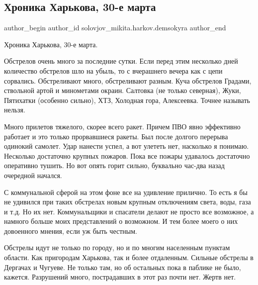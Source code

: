  
 
 
 
 
 
\subsection{Хроника Харькова, 30-е марта}
\label{sec:30_03_2022.fb.solovjov_mikita.harkov.demsokyra.1.hronika}
 
\ifcmt
 author_begin
   author_id solovjov_mikita.harkov.demsokyra
 author_end
\fi

Хроника Харькова, 30-е марта. 

Обстрелов очень много за последние сутки. Если перед этим несколько дней
количество обстрелов шло на убыль, то с вчерашнего вечера как с цепи сорвались.
Обстреливают много, обстреливают разным. Куча обстрелов Градами, ствольной
артой и минометами окраин. Салтовка (не только северная), Жуки, Пятихатки
(особенно сильно), ХТЗ, Холодная гора, Алексеевка. Точнее называть нельзя.

Много прилетов тяжелого, скорее всего ракет. Причем ПВО явно эффективно
работает и это только прорвавшиеся ракеты. Был после долгого перерыва одинокий
самолет. Удар нанести успел, а вот улететь нет, насколько я понимаю. Несколько
достаточно крупных пожаров. Пока все пожары удавалось достаточно оперативно
тушить. Но вот опять горит сильно, буквально час-два назад очередной начался.

С коммунальной сферой на этом фоне все на удивление прилично. То есть я бы не
удивился при таких обстрелах новым крупным отключениям света, воды, газа и т.д.
Но их нет. Коммунальщики и спасатели делают не просто все возможное, а намного
больше моих представлений о возможном. И тем более моего о них довоенного
мнения, если уж быть честным.

Обстрелы идут не только по городу, но и по многим населенным пунктам области.
Как пригородам Харькова, так и более отдаленным. Сильные обстрелы в Дергачах и
Чугуеве. Не только там, но об остальных пока в паблике не было, кажется.
Разрушений много, пострадавших в этот раз почти нет. Жертв нет.

